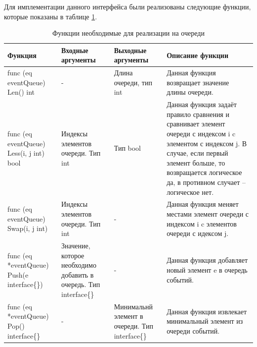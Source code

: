 Для имплементации данного интерфейса были реализованы следующие функции, которые показаны в таблице \ref{tab:queue}. 

\begin{table}[]
\centering
\caption{Функции необходимые для реализации на очереди}
\label{tab:queue}
\begin{tabularx}{\textwidth}{|X|X|X|X|}
\hline
Функция                                      & Входные аргументы                                                          & Выходные аргументы                              & Описание функции                                                                                                                                                                                                         \\ \hline
func (eq eventQueue) Len() int               & -                                                                          & Длина очереди, тип int                          & Данная функция возвращает значение длины очереди.                                                                                                                                                                        \\ \hline
func (eq eventQueue) Less(i, j int) bool     & Индексы элементов очереди. Тип int                                         & Тип bool                                        & Данная функция задаёт правило сравнения и  сравнивает элемент очереди с индексом i c элементом с индексом j. В случае, если первый элемент больше, то возвращается логическое да, в противном случает -- логическое нет. \\ \hline
func (eq eventQueue) Swap(i, j int)          & Индексы элементов очереди. Тип int                                         & -                                               & Данная функция меняет местами элемент очереди с индексом i c элементов очереди с идексом j.                                                                                                                              \\ \hline
func (eq *eventQueue) Push(e interface\{\})  & Значение, которое необходимо добавить в очередь. Тип interface\{\}         & -                                               & Данная функция добавляет новый элемент e в очередь событий.                                                                                                                                                              \\ \hline
func (eq *eventQueue) Pop() interface\{\}    & -                                                                          & Минимальнй элемент в очереди. Тип interface\{\} & Данная функция извлекает минимальный элемент из очереди событий.                                                                                                                                                         \\ \hline

\end{tabularx}
\end{table}
